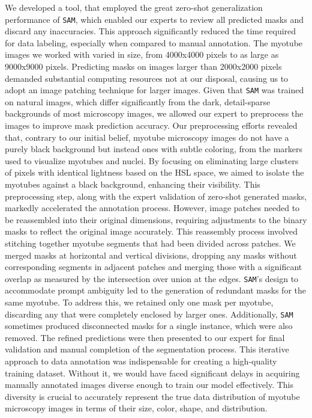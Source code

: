We developed a tool, that employed the great zero-shot generalization performance of \texttt{SAM}, which enabled our experts to review all predicted masks and discard any inaccuracies. This approach significantly reduced the time required for data labeling, especially when compared to manual annotation. The myotube images we worked with varied in size, from 4000x4000 pixels to as large as 9000x9000 pixels. Predicting masks on images larger than 2000x2000 pixels demanded substantial computing resources not at our disposal, causing us to adopt an image patching technique for larger images.
Given that \texttt{SAM} was trained on natural images, which differ significantly from the dark, detail-sparse backgrounds of most microscopy images, we allowed our expert to preprocess the images to improve mask prediction accuracy. Our preprocessing efforts revealed that, contrary to our initial belief, myotube microscopy images do not have a purely black background but instead ones with subtle coloring, from the markers used to visualize myotubes and nuclei. By focusing on eliminating large clusters of pixels with identical lightness based on the HSL space, we aimed to isolate the myotubes against a black background, enhancing their visibility. This preprocessing step, along with the expert validation of zero-shot generated masks, markedly accelerated the annotation process.
However, image patches needed to be reassembled into their original dimensions, requiring adjustments to the binary masks to reflect the original image accurately. This reassembly process involved stitching together myotube segments that had been divided across patches. We merged masks at horizontal and vertical divisions, dropping any masks without corresponding segments in adjacent patches and merging those with a significant overlap as measured by the intersection over union at the edges.
\texttt{SAM}'s design to accommodate prompt ambiguity led to the generation of redundant masks for the same myotube. To address this, we retained only one mask per myotube, discarding any that were completely enclosed by larger ones. Additionally, \texttt{SAM} sometimes produced disconnected masks for a single instance, which were also removed.
The refined predictions were then presented to our expert for final validation and manual completion of the segmentation process. This iterative approach to data annotation was indispensable for creating a high-quality training dataset. Without it, we would have faced significant delays in acquiring manually annotated images diverse enough to train our model effectively. This diversity is crucial to accurately represent the true data distribution of myotube microscopy images in terms of their size, color, shape, and distribution.

